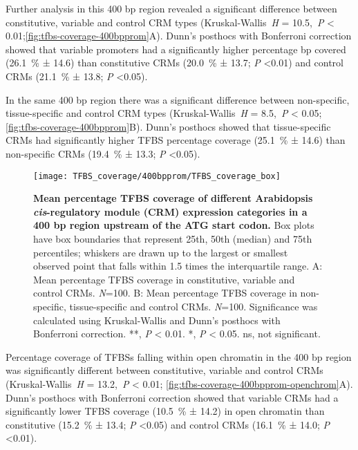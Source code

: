 \documentclass[../main.tex]{subfiles}
\begin{document}
Further analysis in this 400 bp region revealed a significant difference between constitutive, variable and control CRM types (Kruskal\hyp{}Wallis~\textit{H} = 10.5,~\textit{P} \textless{} 0.01;\autoref{fig:tfbs-coverage-400bpprom}A).
Dunn's posthocs with Bonferroni correction showed that variable promoters had a significantly higher percentage bp covered (\SI{26.1}{\percent} ± 14.6) than constitutive CRMs (\SI{20.0}{\percent} ± 13.7; \textit{P} \textless 0.01) and control CRMs (\SI{21.1}{\percent} ± 13.8; \textit{P} \textless 0.05).

In the same 400 bp region there was a significant difference between non\hyp{}specific, tissue\hyp{}specific and control CRM types (Kruskal\hyp{}Wallis~\textit{H} = 8.5,~\textit{P} \textless{} 0.05; \autoref{fig:tfbs-coverage-400bpprom}B).
Dunn's posthocs showed that tissue\hyp{}specific CRMs had significantly higher TFBS percentage coverage (\SI{25.1}{\percent} ± 14.6) than non\hyp{}specific CRMs (\SI{19.4}{\percent} ± 13.3; \textit{P} \textless 0.05).


\begin{figure}[hbt!]
	\begin{center}
		\capstart
		\texttt{[image: TFBS\_coverage/400bpprom/TFBS\_coverage\_box]}
		\caption{
			\textbf{Mean percentage TFBS coverage of different Arabidopsis \textit{cis}\hyp{}regulatory module (CRM) expression categories in a 400 bp region upstream of the ATG start codon.}
			Box plots have box boundaries that represent 25th, 50th (median) and 75th percentiles; whiskers are drawn up to the largest or smallest observed point that falls within 1.5 times the interquartile range.
			A: Mean percentage TFBS coverage in constitutive, variable and control CRMs. \textit{N}=100.
			B: Mean percentage TFBS coverage in non\hyp{}specific, tissue\hyp{}specific and control CRMs. \textit{N}=100.
			Significance was calculated using Kruskal\hyp{}Wallis and Dunn's posthocs with Bonferroni correction.
			**, \textit{P} \textless{} 0.01. *, \textit{P} \textless{} 0.05. ns, not significant.
			\label{fig:tfbs-coverage-400bpprom}
		}
	\end{center}
\end{figure}

Percentage coverage of TFBSs falling within open chromatin in the 400 bp region was significantly different between constitutive, variable and control CRMs (Kruskal\hyp{}Wallis~\textit{H} = 13.2,~\textit{P} \textless{} 0.01; \autoref{fig:tfbs-coverage-400bpprom-openchrom}A).
Dunn's posthocs with Bonferroni correction showed that variable CRMs had a significantly lower TFBS coverage (\SI{10.5}{\percent} ± 14.2) in open chromatin than constitutive (\SI{15.2}{\percent} ± 13.4; \textit{P} \textless 0.05) and control CRMs (\SI{16.1}{\percent} ± 14.0; \textit{P} \textless 0.01).
\end{document}

